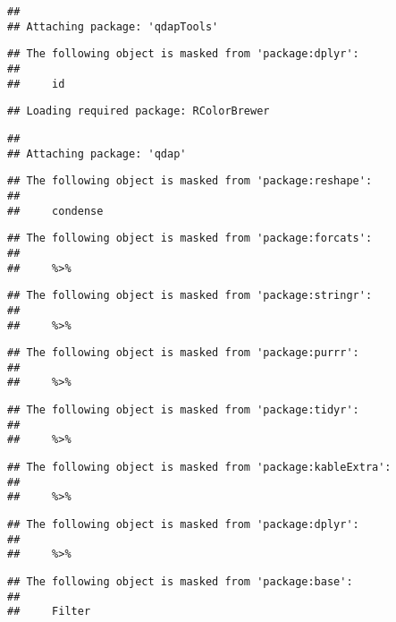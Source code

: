 \documentclass[]{article}
\begin{document}
\begin{verbatim}
## 
## Attaching package: 'qdapTools'
\end{verbatim}

\begin{verbatim}
## The following object is masked from 'package:dplyr':
## 
##     id
\end{verbatim}

\begin{verbatim}
## Loading required package: RColorBrewer
\end{verbatim}

\begin{verbatim}
## 
## Attaching package: 'qdap'
\end{verbatim}

\begin{verbatim}
## The following object is masked from 'package:reshape':
## 
##     condense
\end{verbatim}

\begin{verbatim}
## The following object is masked from 'package:forcats':
## 
##     %>%
\end{verbatim}

\begin{verbatim}
## The following object is masked from 'package:stringr':
## 
##     %>%
\end{verbatim}

\begin{verbatim}
## The following object is masked from 'package:purrr':
## 
##     %>%
\end{verbatim}

\begin{verbatim}
## The following object is masked from 'package:tidyr':
## 
##     %>%
\end{verbatim}

\begin{verbatim}
## The following object is masked from 'package:kableExtra':
## 
##     %>%
\end{verbatim}

\begin{verbatim}
## The following object is masked from 'package:dplyr':
## 
##     %>%
\end{verbatim}

\begin{verbatim}
## The following object is masked from 'package:base':
## 
##     Filter
\end{verbatim}
\end{document}
